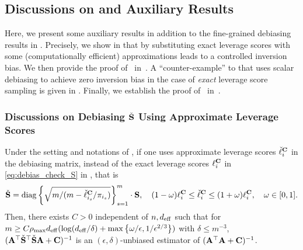 \documentclass[11pt,a4paper]{article}
\begin{document}
\subsection{Discussions on  and Auxiliary Results}
\label{subsec:discussion_prop:debias}

Here, we present some auxiliary results in addition to the fine-grained debiasing results in .
Precisely, we show in  that by substituting exact leverage scores with some (computationally efficient) approximations leads to a controlled inversion bias.    
We then provide the proof of~ in~. 
A ``counter-example'' to \citet[Theorem~10]{derezinski2021sparse} that uses scalar debiasing to achieve zero inversion bias in the case of \emph{exact} leverage score sampling is given in .
Finally, we establish the proof of~ in~.

\subsubsection{Discussions on Debiasing $\check{\S}$ Using Approximate Leverage Scores} \label{subsec:proof_of_approximate_lev_check_S}

\begin{corollary}\label{coro:proof_of_approximate_lev}\normalfont
Under the setting and notations of , if one uses approximate leverage scores $\check\ell^{\C}_i$  in the debiasing matrix, instead of the exact leverage scores $\ell^{\C}_i$ in \eqref{eq:debias_check_S} in , that is
\begin{equation*}
    \check\S =\diag \left\{\sqrt{m/(m-\check\ell_{i_s}^\C/\pi_{i_s})} \right\}^m_{s=1}\cdot\S, \quad (1 - \omega) \ell_i^\C \leq  \check \ell^{\C}_{i} \leq (1+ \omega) \ell_i^\C, \quad \omega\in[0,1].
\end{equation*}
Then, there exists $C > 0$ independent of $n,d_{\eff}$ such that for $m\geq C\rho_{\max} d_{\eff} (\log(d_{\eff}/\delta )+\max\left\{\omega/\epsilon, 1/\epsilon^{2/3} \right\})$ with $\delta\leq m^{-3}$, $(\A^\top \check\S^\top \check\S \A + \C )^{-1}$ is an $(\epsilon,\delta)$-unbiased estimator of $(\A^\top  \A + \C)^{-1}$. 
\end{corollary}
\end{document}
